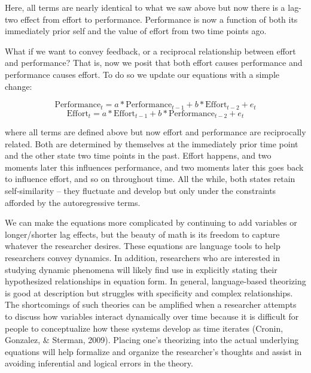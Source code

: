 \documentclass[english,,man]{apa6}
\theoremstyle{definition}
\theoremstyle{definition}
\theoremstyle{definition}
\theoremstyle{remark}
\begin{document}
\noindent Here, all terms are nearly identical to what we saw above but
now there is a lag-two effect from effort to performance. Performance is
now a function of both its immediately prior self and the value of
effort from two time points ago.

What if we want to convey feedback, or a reciprocal relationship between
effort and performance? That is, now we posit that both effort causes
performance and performance causes effort. To do so we update our
equations with a simple change:

\begin{equation}
\label{sysy3}
\textrm{Performance}_{t} = a * \textrm{Performance}_{t - 1} + b * \textrm{Effort}_{t - 2} + e_{t}
\end{equation} \begin{equation}
\label{sysx3}
\textrm{Effort}_{t} = a * \textrm{Effort}_{t - 1} + b * \textrm{Performance}_{t - 2} + e_{t}
\end{equation}

\noindent where all terms are defined above but now effort and
performance are reciprocally related. Both are determined by themselves
at the immediately prior time point and the other state two time points
in the past. Effort happens, and two moments later this influences
performance, and two moments later this goes back to influence effort,
and so on throughout time. All the while, both states retain
self-similarity -- they fluctuate and develop but only under the
constraints afforded by the autoregressive terms.

We can make the equations more complicated by continuing to add
variables or longer/shorter lag effects, but the beauty of math is its
freedom to capture whatever the researcher desires. These equations are
language tools to help researchers convey dynamics. In addition,
researchers who are interested in studying dynamic phenomena will likely
find use in explicitly stating their hypothesized relationships in
equation form. In general, language-based theorizing is good at
description but struggles with specificity and complex relationships.
The shortcomings of such theories can be amplified when a researcher
attempts to discuss how variables interact dynamically over time because
it is difficult for people to conceptualize how these systems develop as
time iterates (Cronin, Gonzalez, \& Sterman, 2009). Placing one's
theorizing into the actual underlying equations will help formalize and
organize the researcher's thoughts and assist in avoiding inferential
and logical errors in the theory.
\end{document}
